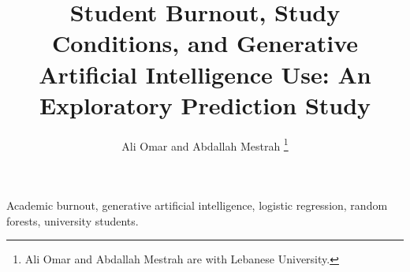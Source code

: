 \documentclass{IEEEtran}
\title{Student Burnout, Study Conditions, and Generative Artificial Intelligence Use: An Exploratory Prediction Study}
\author{Ali Omar and Abdallah Mestrah%
\thanks{Ali Omar and Abdallah Mestrah are with Lebanese University.}}
\begin{document}
\maketitle



\begin{IEEEkeywords}
Academic burnout, generative artificial intelligence, logistic regression, random forests, university students.
\end{IEEEkeywords}









\end{document}
